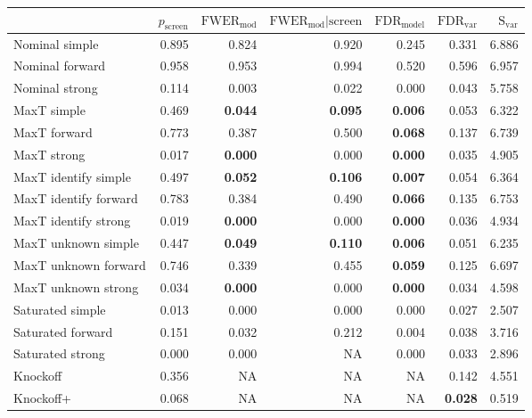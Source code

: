 
\newcommand{\guarantee}[1]{{\bf #1}}
\begin{tabular}{|l|rrrrrr|}
 \hline
{} &  $p_{\text{screen}}$ &  $\text{FWER}_{\text{mod}}$ &  $\text{FWER}_{\text{mod}} \vert \text{screen}$ &  $\text{FDR}_{\text{model}}$ &  $\text{FDR}_{\text{var}}$ &  $\text{S}_{\text{var}}$ \\ \hline
Nominal simple & 0.895 & 0.824 & 0.920 & 0.245 & 0.331 & 6.886 \\ 
Nominal forward & 0.958 & 0.953 & 0.994 & 0.520 & 0.596 & 6.957 \\ 
Nominal strong & 0.114 & 0.003 & 0.022 & 0.000 & 0.043 & 5.758 \\ 
MaxT simple & 0.469 & \guarantee{0.044} & \guarantee{0.095} & \guarantee{0.006} & 0.053 & 6.322 \\ 
MaxT forward & 0.773 & 0.387 & 0.500 & \guarantee{0.068} & 0.137 & 6.739 \\ 
MaxT strong & 0.017 & \guarantee{0.000} & 0.000 & \guarantee{0.000} & 0.035 & 4.905 \\ 
MaxT identify simple & 0.497 & \guarantee{0.052} & \guarantee{0.106} & \guarantee{0.007} & 0.054 & 6.364 \\ 
MaxT identify forward & 0.783 & 0.384 & 0.490 & \guarantee{0.066} & 0.135 & 6.753 \\ 
MaxT identify strong & 0.019 & \guarantee{0.000} & 0.000 & \guarantee{0.000} & 0.036 & 4.934 \\ 
MaxT unknown simple & 0.447 & \guarantee{0.049} & \guarantee{0.110} & \guarantee{0.006} & 0.051 & 6.235 \\ 
MaxT unknown forward & 0.746 & 0.339 & 0.455 & \guarantee{0.059} & 0.125 & 6.697 \\ 
MaxT unknown strong & 0.034 & \guarantee{0.000} & 0.000 & \guarantee{0.000} & 0.034 & 4.598 \\ 
Saturated simple & 0.013 & 0.000 & 0.000 & 0.000 & 0.027 & 2.507 \\ 
Saturated forward & 0.151 & 0.032 & 0.212 & 0.004 & 0.038 & 3.716 \\ 
Saturated strong & 0.000 & 0.000 & NA & 0.000 & 0.033 & 2.896 \\ 
Knockoff & 0.356 & NA & NA & NA & 0.142 & 4.551 \\ 
Knockoff+ & 0.068 & NA & NA & NA & \guarantee{0.028} & 0.519 \\   \hline
\end{tabular}